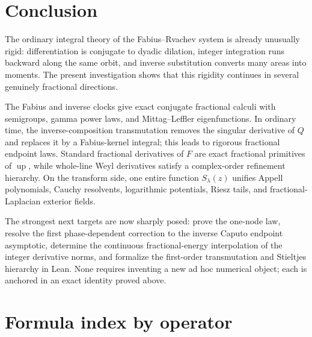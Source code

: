 \documentclass[11pt,oneside]{article}
\numberwithin{equation}{section}
\theoremstyle{plain}
\theoremstyle{definition}
\theoremstyle{remark}
\newcommand{\Up}{\operatorname{up}}
\begin{document}
\section{Conclusion}

The ordinary integral theory of the Fabius--Rvachev system is already unusually
rigid: differentiation is conjugate to dyadic dilation, integer integration
runs backward along the same orbit, and inverse substitution converts many
areas into moments.  The present investigation shows that this rigidity
continues in several genuinely fractional directions.

The Fabius and inverse clocks give exact conjugate fractional calculi with
semigroups, gamma power laws, and Mittag--Leffler eigenfunctions.  In ordinary
time, the inverse-composition transmutation removes the singular derivative of
$Q$ and replaces it by a Fabius-kernel integral; this leads to rigorous
fractional endpoint laws.  Standard fractional derivatives of $F$ are exact
fractional primitives of $\Up$, while whole-line Weyl derivatives satisfy a
complex-order refinement hierarchy.  On the transform side, one entire
function $S_\lambda(z)$ unifies Appell polynomials, Cauchy resolvents, logarithmic
potentials, Riesz tails, and fractional-Laplacian exterior fields.

The strongest next targets are now sharply posed: prove the one-node law,
resolve the first phase-dependent correction to the inverse Caputo endpoint
asymptotic, determine the continuous fractional-energy interpolation of the
integer derivative norms, and formalize the first-order transmutation and
Stieltjes hierarchy in Lean.  None requires inventing a new ad hoc numerical
object; each is anchored in an exact identity proved above.

\appendix

\section{Formula index by operator}
\end{document}
